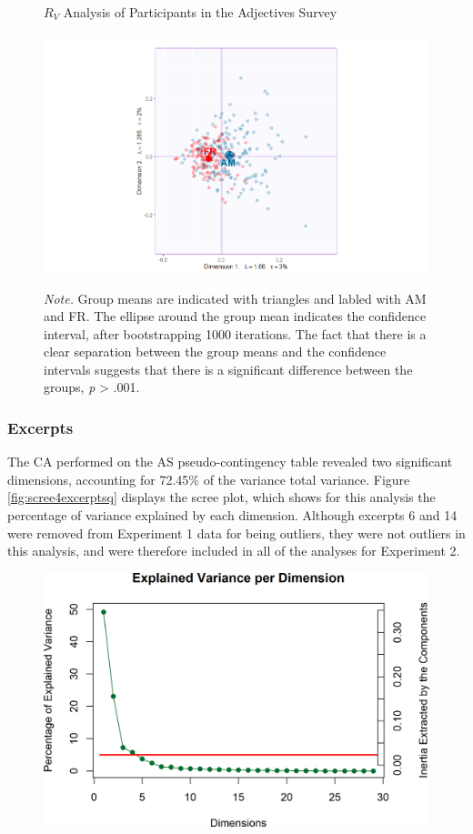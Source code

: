 \documentclass[
  english,
  man,floatsintext]{apa6}
\begin{document}
\begin{figure}   
  \centering  
  \caption{${R_V}$ Analysis of Participants in the Adjectives Survey}
    \includegraphics[width=0.7\columnwidth]{./Music-Descriptor-Space_files/figure-latex/apartrvmap.png}
  \label{fig:map4RVA}
  \caption*{\footnotesize \textit{Note.}  Group means are indicated with triangles and labled with AM and FR. The ellipse around the group mean indicates the confidence interval, after bootstrapping 1000 iterations. The fact that there is a clear separation between the group means and the confidence intervals suggests that there is a significant difference between the groups, \textit{p} > .001.}
\end{figure}

\hypertarget{excerpts-1}{%
\subsubsection{Excerpts}\label{excerpts-1}}

The CA performed on the AS pseudo-contingency table revealed two significant dimensions, accounting for 72.45\% of the variance total variance. Figure \ref{fig:scree4excerptsq} displays the scree plot, which shows for this analysis the percentage of variance explained by each dimension. Although excerpts 6 and 14 were removed from Experiment 1 data for being outliers, they were not outliers in this analysis, and were therefore included in all of the analyses for Experiment 2.

\begin{figure}  
  \begin{center}
    \includegraphics{./Music-Descriptor-Space_files/figure-latex/scree4descriptors-1.png}
  \caption{ }\label{fig:scree4descriptors}  
 \end{center}
\end{figure}
\end{document}
